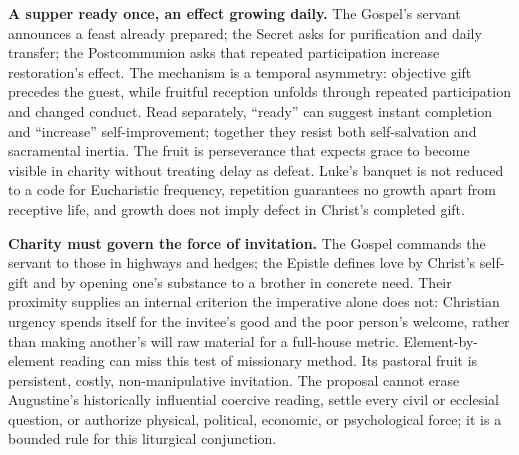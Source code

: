 \noindent\textbf{A supper ready once, an effect growing daily.\enspace{}}
The Gospel's servant announces a feast already prepared; the Secret asks for purification and daily transfer; the Postcommunion asks that repeated participation increase restoration's effect. The mechanism is a temporal asymmetry: objective gift precedes the guest, while fruitful reception unfolds through repeated participation and changed conduct. Read separately, ``ready'' can suggest instant completion and ``increase'' self-improvement; together they resist both self-salvation and sacramental inertia. The fruit is perseverance that expects grace to become visible in charity without treating delay as defeat. Luke's banquet is not reduced to a code for Eucharistic frequency, repetition guarantees no growth apart from receptive life, and growth does not imply defect in Christ's completed gift.

\noindent\textbf{Charity must govern the force of invitation.\enspace{}}
The Gospel commands the servant to  those in highways and hedges; the Epistle defines love by Christ's self-gift and by opening one's substance to a brother in concrete need. Their proximity supplies an internal criterion the imperative alone does not: Christian urgency spends itself for the invitee's good and the poor person's welcome, rather than making another's will raw material for a full-house metric. Element-by-element reading can miss this test of missionary method. Its pastoral fruit is persistent, costly, non-manipulative invitation. The proposal cannot erase Augustine's historically influential coercive reading, settle every civil or ecclesial question, or authorize physical, political, economic, or psychological force; it is a bounded rule for this liturgical conjunction.
